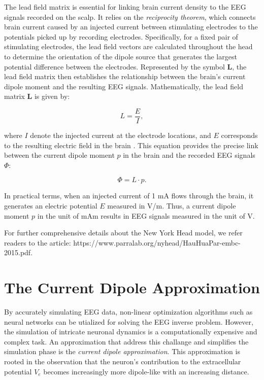 \documentclass[a4paper, UKenglish, 11pt]{uiomaster}
\begin{document}
The lead field matrix is essential for linking brain current density to the EEG signals recorded on the scalp. It relies on the \emph{reciprocity theorem}, which connects brain current caused by an injected current between stimulating electrodes to the potentials picked up by recording electrodes. Specifically, for a fixed pair of stimulating electrodes, the lead field vectors are calculated throughout the head to determine the orientation of the dipole source that generates the largest potential difference between the electrodes. Represented by the symbol $\boldsymbol{L}$, the lead field matrix then establishes the relationship between the brain's current dipole moment and the resulting EEG signals. Mathematically, the lead field matrix $\boldsymbol{L}$ is given by:

\begin{equation}
L = \frac{E}{I},
\label{eq:R2}
\end{equation}

where $I$ denote the injected current at the electrode locations, and $E$ corresponds to the resulting electric field in the brain \cite{naess2021biophysically}. This equation provides the precise link between the current dipole moment $p$ in the brain and the recorded EEG signals $\Phi$:

\begin{equation}
\Phi = L \cdot p.
\label{eq:EEG_signal}
\end{equation}

In practical terms, when an injected current of 1 mA flows through the brain, it generates an electric potential $E$ measured in V/m. Thus, a current dipole moment $p$ in the unit of mAm results in EEG signals measured in the unit of V.

For further comprehensive details about the New York Head model, we refer readers to the article: https://www.parralab.org/nyhead/HauHuaPar-embc-2015.pdf.


\section{The Current Dipole Approximation}
By accurately simulating EEG data, non-linear optimization algorithms such as neural networks can be utialized for solving the EEG inverse problem. However, the simulation of intricate neuronal dynamics is a computationally expensive and complex task. An approximation that address this challange and simplifies the simulation phase is the \emph{current dipole approximation}. This approximation is rooted in the observation that the neuron's contribution to the extracellular potential $V_e$ becomes increasingly more dipole-like with an increasing distance.
\end{document}
